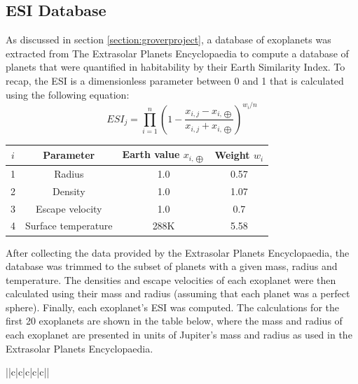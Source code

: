 \documentclass{article}[11pt]
\begin{document}
\pagebreak
\subsection{ESI Database}\label{appendix:ESI}
As discussed in section \ref{section:groverproject}, a database of exoplanets was extracted from The Extrasolar Planets Encyclopaedia to compute a database of planets that were quantified in habitability by their Earth Similarity Index. To recap, the ESI is a dimensionless parameter between 0 and 1 that is calculated using the following equation:
\begin{equation}
ESI_j=\prod^n_{i=1}{\left(1-\frac{x_{i,j}-x_{i,\bigoplus}}{x_{i,j}+x_{i,\bigoplus}}\right)^{w_i/n}}
\end{equation}
\begin{center}
\begin{tabular}{||c|c|c|c||}
\hline
$i$ & \textbf{Parameter} & \textbf{Earth value} $x_{i,\bigoplus}$ & \textbf{Weight} $w_i$ \\
\hline
1 & Radius  & 1.0  & 0.57 \\
\hline
2 & Density  & 1.0 & 1.07 \\
\hline
3 & Escape velocity  & 1.0 & 0.7 \\
\hline
4 & Surface temperature & 288K & 5.58 \\
\hline
\end{tabular}
\end{center} 

After collecting the data provided by the Extrasolar Planets Encyclopaedia\cite{EPE}, the database was trimmed to the subset of planets with a given mass, radius and temperature. The densities and escape velocities of each exoplanet were then calculated using their mass and radius (assuming that each planet was a perfect sphere). Finally, each exoplanet's ESI was computed. The calculations for the first 20 exoplanets are shown in the table below, where the mass and radius of each exoplanet are presented in units of Jupiter's mass and radius as used in the Extrasolar Planets Encyclopaedia.\cite{EPE}

 \tabletail{\midrule}
\tablelasttail{\bottomrule}
\begin{center}
\begin{supertabular}{||c|c|c|c|c||}
 \bottomrule
 \end{supertabular}
 \end{center}
\end{document}
